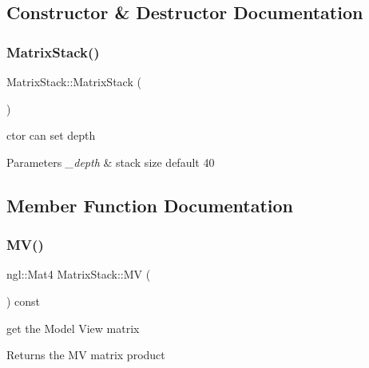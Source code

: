 \subsection{Constructor \& Destructor Documentation}
\mbox{\label{class_matrix_stack_a3244319384a8d7af077670f69d8d9e6e}} 
\subsubsection{\texorpdfstring{Matrix\+Stack()}{MatrixStack()}}
{\footnotesize\ttfamily Matrix\+Stack\+::\+Matrix\+Stack (\begin{DoxyParamCaption}{ }\end{DoxyParamCaption})\hspace{0.3cm}{\ttfamily [inline]}}



ctor can set depth 


\begin{DoxyParams}{Parameters}
{\em \+\_\+depth} & stack size default 40 \\
\hline
\end{DoxyParams}


\subsection{Member Function Documentation}
\mbox{\label{class_matrix_stack_a603053372fd07bef6bf7dfac3fc391c1}} 
\subsubsection{\texorpdfstring{M\+V()}{MV()}}
{\footnotesize\ttfamily ngl\+::\+Mat4 Matrix\+Stack\+::\+MV (\begin{DoxyParamCaption}{ }\end{DoxyParamCaption}) const\hspace{0.3cm}{\ttfamily [inline]}}



get the Model View matrix 

\begin{DoxyReturn}{Returns}
the MV matrix product 
\end{DoxyReturn}
\mbox{\label{class_matrix_stack_ac42d10e96245541da10045d2e6824fd2}} 
